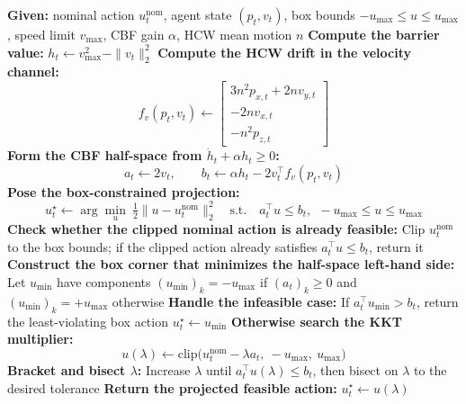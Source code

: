\begin{algorithm}[H]
\caption{Velocity CBF-QP Saturation Filter}
\label{alg:velocity-cbf-qp}
\begin{algorithmic}[1]
\State \textbf{Given:} nominal action $u_t^{\mathrm{nom}}$, agent state $(p_t,v_t)$, box bounds $-u_{\max}\le u\le u_{\max}$, speed limit $v_{\max}$, CBF gain $\alpha$, HCW mean motion $n$
\State \textbf{Compute the barrier value:}
\State \hspace{1em} $h_t \leftarrow v_{\max}^2-\|v_t\|_2^2$
\State \textbf{Compute the HCW drift in the velocity channel:}
\State \hspace{1em}
\[
f_v(p_t,v_t)\leftarrow
\begin{bmatrix}
3n^2 p_{x,t}+2n v_{y,t}\\
-2n v_{x,t}\\
-n^2 p_{z,t}
\end{bmatrix}
\]
\State \textbf{Form the CBF half-space from $\dot h_t+\alpha h_t\ge 0$:}
\State \hspace{1em}
\[
a_t \leftarrow 2v_t,\qquad
b_t \leftarrow \alpha h_t - 2 v_t^\top f_v(p_t,v_t)
\]
\State \textbf{Pose the box-constrained projection:}
\State \hspace{1em}
\[
u_t^\star \leftarrow
\arg\min_{u}\ \tfrac12\|u-u_t^{\mathrm{nom}}\|_2^2
\quad\text{s.t.}\quad
a_t^\top u \le b_t,\ \ -u_{\max}\le u\le u_{\max}
\]
\State \textbf{Check whether the clipped nominal action is already feasible:}
\State \hspace{1em} Clip $u_t^{\mathrm{nom}}$ to the box bounds; if the clipped action already satisfies $a_t^\top u \le b_t$, return it
\State \textbf{Construct the box corner that minimizes the half-space left-hand side:}
\State \hspace{1em} Let $u_{\min}$ have components $(u_{\min})_k=-u_{\max}$ if $(a_t)_k\ge 0$ and $(u_{\min})_k=+u_{\max}$ otherwise
\State \textbf{Handle the infeasible case:}
\State \hspace{1em} If $a_t^\top u_{\min}>b_t$, return the least-violating box action $u_t^\star\leftarrow u_{\min}$
\State \textbf{Otherwise search the KKT multiplier:}
\State \hspace{1em}
\[
u(\lambda)\leftarrow \mathrm{clip}\!\big(u_t^{\mathrm{nom}}-\lambda a_t,\ -u_{\max},\ u_{\max}\big)
\]
\State \textbf{Bracket and bisect $\lambda$:}
\State \hspace{1em} Increase $\lambda$ until $a_t^\top u(\lambda)\le b_t$, then bisect on $\lambda$ to the desired tolerance
\State \textbf{Return the projected feasible action:}
\State \hspace{1em} $u_t^\star \leftarrow u(\lambda)$
\end{algorithmic}
\end{algorithm}
